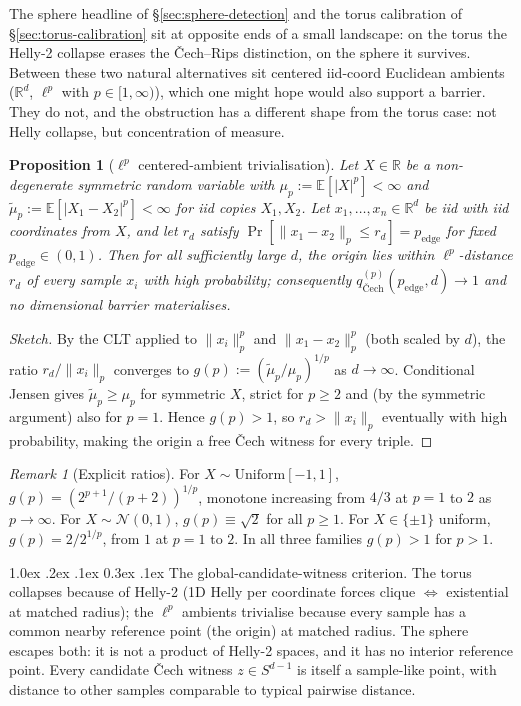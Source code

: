 \documentclass[reqno,12pt]{amsart}
\makeatletter
\renewcommand\paragraph{\@startsection{paragraph}{4}{\z@}%
  {1.0ex \@plus .2ex \@minus .1ex}%
  {0.3ex \@plus .1ex}%
  {\normalfont\normalsize\bfseries}}
\newcommand{\RR}{\mathbb{R}}
\newcommand{\EE}{\mathbb{E}}
\theoremstyle{plain}
\newtheorem{proposition}[theorem]{Proposition}
\theoremstyle{definition}
\theoremstyle{remark}
\newtheorem{remark}[theorem]{Remark}
\makeatother
\begin{document}
The sphere headline of \S\ref{sec:sphere-detection} and the torus calibration of
\S\ref{sec:torus-calibration} sit at opposite ends of a small landscape: on the torus the
Helly-2 collapse erases the \v{C}ech--Rips distinction, on the sphere it survives. Between
these two natural alternatives sit centered iid-coord Euclidean ambients ($\RR^d$,
$\ell^p$ with $p \in [1, \infty)$), which one might hope would also support a barrier.
They do not, and the obstruction has a different shape from the torus case: not Helly
collapse, but concentration of measure.

\begin{proposition}[$\ell^p$ centered-ambient trivialisation]\label{prop:lp-nogo}
Let $X \in \RR$ be a non-degenerate symmetric random variable with $\mu_p := \EE[|X|^p] <
\infty$ and $\tilde\mu_p := \EE[|X_1 - X_2|^p] < \infty$ for iid copies $X_1, X_2$. Let
$x_1, \dots, x_n \in \RR^d$ be iid with iid coordinates from $X$, and let $r_d$ satisfy
$\Pr[\|x_1 - x_2\|_p \le r_d] = p_{\mathrm{edge}}$ for fixed $p_{\mathrm{edge}} \in (0,
1)$. Then for all sufficiently large $d$, the origin lies within $\ell^p$-distance $r_d$
of every sample $x_i$ with high probability; consequently $q_{\text{\v{C}ech}}^{(p)}(p_{\mathrm{edge}},
d) \to 1$ and no dimensional barrier materialises.\label{sec:lp-nogo}
\end{proposition}

\begin{proof}[Sketch] By the CLT applied to $\|x_i\|_p^p$ and $\|x_1 - x_2\|_p^p$
(both scaled by $d$), the ratio $r_d / \|x_i\|_p$ converges to
$g(p) := (\tilde\mu_p / \mu_p)^{1/p}$ as $d \to \infty$. Conditional Jensen gives
$\tilde\mu_p \ge \mu_p$ for symmetric $X$, strict for $p \ge 2$ and (by the symmetric
argument) also for $p = 1$. Hence $g(p) > 1$, so $r_d > \|x_i\|_p$ eventually with high
probability, making the origin a free \v{C}ech witness for every triple.
\end{proof}

\begin{remark}[Explicit ratios]\label{rmk:lp-ratios}
For $X \sim \mathrm{Uniform}[-1, 1]$, $g(p) = (2^{p+1}/(p+2))^{1/p}$, monotone increasing
from $4/3$ at $p = 1$ to $2$ as $p \to \infty$. For $X \sim \mathcal N(0, 1)$, $g(p) \equiv
\sqrt 2$ for all $p \ge 1$. For $X \in \{\pm 1\}$ uniform, $g(p) = 2 / 2^{1/p}$, from $1$
at $p = 1$ to $2$. In all three families $g(p) > 1$ for $p > 1$.
\end{remark}

\paragraph{The global-candidate-witness criterion.}
The torus collapses because of Helly-2 (1D Helly per coordinate forces clique
$\Leftrightarrow$ existential at matched radius); the $\ell^p$ ambients trivialise because
every sample has a common nearby reference point (the origin) at matched radius. The
sphere escapes both: it is not a product of Helly-2 spaces, and it has no interior
reference point. Every candidate \v{C}ech witness $z \in S^{d-1}$ is itself a sample-like
point, with distance to other samples comparable to typical pairwise distance.
\end{document}
